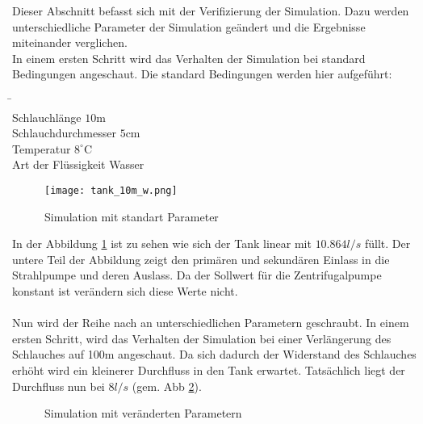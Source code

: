 Dieser Abschnitt befasst sich mit der Verifizierung der Simulation. Dazu werden unterschiedliche Parameter der Simulation geändert und die Ergebnisse miteinander verglichen.\\
In einem ersten Schritt wird das Verhalten der Simulation bei standard Bedingungen angeschaut. Die standard Bedingungen werden hier aufgeführt:

\begin{tabbing}
\hspace{120mm}			\=  \hspace{10mm} \=	\\
Schlauchlänge			\> $10$m		\\
Schlauchdurchmesser		\> $5$cm		\\
Temperatur			\> $8^{\circ}$C		\\
Art der Flüssigkeit		\> Wasser	\> 		\\
\end{tabbing}

\begin{figure}[htb]
\texttt{[image: tank\_10m\_w.png]}
\caption{Simulation mit standart Parameter}
\label{fig:Simulation mit standard Parameter}
\end{figure}

In der Abbildung \ref{fig:Simulation mit standard Parameter} ist zu sehen wie sich der Tank linear mit $10.864 l/s$ füllt. Der untere Teil der Abbildung zeigt den primären und sekundären Einlass in die Strahlpumpe und deren Auslass. Da der Sollwert für die Zentrifugalpumpe konstant ist verändern sich diese Werte nicht.\\
\\
Nun wird der Reihe nach an unterschiedlichen Parametern geschraubt. In einem ersten Schritt, wird das Verhalten der Simulation bei einer Verlängerung des Schlauches auf 100m angeschaut. Da sich dadurch der Widerstand des Schlauches erhöht wird ein kleinerer Durchfluss in den Tank erwartet. Tatsächlich liegt der Durchfluss nun bei $8 l/s$ (gem. Abb \ref{fig:Simulation mit veränderten Parametern}).
\clearpage

\begin{figure}[htb]
\caption{Simulation mit veränderten Parametern}
\label{fig:Simulation mit veränderten Parametern}
\end{figure}

